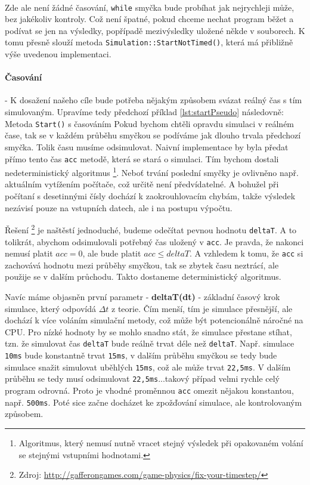 \paragraph{}
Zde ale není žádné časování, \texttt{while} smyčka bude probíhat jak nejrychleji může, bez jakékoliv kontroly. Což není špatné, pokud chceme nechat program běžet a podívat se jen na výsledky, popřípadě mezivýsledky uložené někde v souborech. K tomu přesně slouží metoda \texttt{Simulation::StartNotTimed()}, která má přibližně výše uvedenou implementaci. 
\paragraph{Časování}
- K dosažení našeho cíle bude potřeba nějakým způsobem svázat reálný čas s tím simulovaným. Upravíme tedy předchozí příklad \ref{lst:startPseudo} následovně:
{Metoda \texttt{Start()} s časováním}
Pokud bychom chtěli opravdu simulaci v reálném čase, tak se v každém průběhu smyčkou se podíváme jak dlouho trvala předchozí smyčka. Tolik času musíme odsimulovat. Naivní implementace by byla předat přímo tento čas \texttt{acc} metodě, která se stará o simulaci. Tím bychom dostali nedeterministický algoritmus
\footnote{Algoritmus, který nemusí nutně vracet stejný výsledek při opakovaném volání se stejnými vstupními hodnotami.}.
Neboť trvání poslední smyčky je ovlivněno např. aktuálním vytížením počítače, což určitě není předvídatelné. A bohužel při počítaní s desetinnými čísly dochází k zaokrouhlovacím chybám, takže výsledek nezávisí pouze na vstupních datech, ale i na postupu výpočtu.

Řešení \footnote{Zdroj: \url{http://gafferongames.com/game-physics/fix-your-timestep/}}
je naštěstí jednoduché, budeme odečítat pevnou hodnotu \texttt{deltaT}.
A to tolikrát, abychom odsimulovali potřebný čas uložený v \texttt{acc}. Je pravda,
že nakonci nemusí platit $ acc=0 $, ale bude platit $ acc\leq deltaT $. A vzhledem k tomu, že \texttt{acc} si zachovává hodnotu mezi průběhy smyčkou, tak se zbytek času neztrácí, ale použije se v dalším průchodu. Takto dostaneme deterministický algoritmus.

\label{par:spiral}
Navíc máme objasněn první parametr - \textbf{deltaT(dt)} - základní časový krok simulace, který odpovídá $ \Delta t $ z teorie. Čím menší, tím je simulace přesnější, ale dochází k více voláním simulační metody, což může být potencionálně náročné na CPU.
Pro nízké hodnoty by se mohlo snadno stát, že simulace přestane stíhat, tzn. že simulovat čas \texttt{deltaT} bude reálně trvat déle než \texttt{deltaT}. Např.
simulace \texttt{10ms} bude konstantně trvat \texttt{15ms}, v dalším průběhu smyčkou se tedy bude simulace snažit simulovat uběhlých \texttt{15ms}, což ale může trvat \texttt{22,5ms}. V dalším průběhu se tedy musí odsimulovat \texttt{22,5ms}...takový případ velmi rychle celý program odrovná. Proto je vhodné proměnnou \texttt{acc} omezit nějakou konstantou, např. \texttt{500ms}. Poté sice začne docházet ke zpožďování simulace, ale kontrolovaným způsobem.
